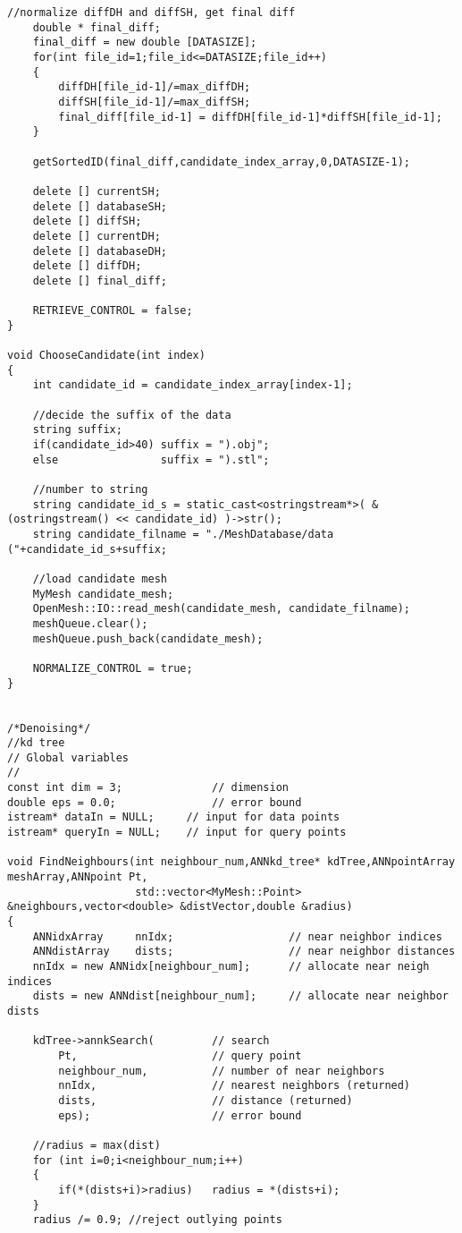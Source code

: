 \begin{enumerate}[1.]
\begin{lstlisting}[xleftmargin=0em]
	//normalize diffDH and diffSH, get final diff
	double * final_diff;
	final_diff = new double [DATASIZE];
	for(int file_id=1;file_id<=DATASIZE;file_id++)
	{
		diffDH[file_id-1]/=max_diffDH;
		diffSH[file_id-1]/=max_diffSH;
		final_diff[file_id-1] = diffDH[file_id-1]*diffSH[file_id-1]; 
	}

	getSortedID(final_diff,candidate_index_array,0,DATASIZE-1);
   
	delete [] currentSH;
	delete [] databaseSH;
	delete [] diffSH;
	delete [] currentDH;
	delete [] databaseDH;
	delete [] diffDH;
	delete [] final_diff;

	RETRIEVE_CONTROL = false;
}

void ChooseCandidate(int index)
{
	int candidate_id = candidate_index_array[index-1];

	//decide the suffix of the data
	string suffix;
	if(candidate_id>40)	suffix = ").obj";
	else				suffix = ").stl";

	//number to string
	string candidate_id_s = static_cast<ostringstream*>( &(ostringstream() << candidate_id) )->str();
	string candidate_filname = "./MeshDatabase/data ("+candidate_id_s+suffix;

	//load candidate mesh 
	MyMesh candidate_mesh;
	OpenMesh::IO::read_mesh(candidate_mesh, candidate_filname);
	meshQueue.clear();
	meshQueue.push_back(candidate_mesh);

	NORMALIZE_CONTROL = true;
}


/*Denoising*/
//kd tree
// Global variables
//
const int dim = 3;				// dimension
double eps = 0.0;				// error bound
istream* dataIn = NULL;		// input for data points
istream* queryIn = NULL;	// input for query points

void FindNeighbours(int neighbour_num,ANNkd_tree* kdTree,ANNpointArray meshArray,ANNpoint Pt,
					std::vector<MyMesh::Point> &neighbours,vector<double> &distVector,double &radius)
{
	ANNidxArray		nnIdx;					// near neighbor indices
	ANNdistArray	dists;					// near neighbor distances
	nnIdx = new ANNidx[neighbour_num];		// allocate near neigh indices
	dists = new ANNdist[neighbour_num];		// allocate near neighbor dists

	kdTree->annkSearch(			// search
		Pt,						// query point
		neighbour_num,	        // number of near neighbors
		nnIdx,					// nearest neighbors (returned)
		dists,					// distance (returned)
		eps);					// error bound
    
	//radius = max(dist)
	for (int i=0;i<neighbour_num;i++)
	{
		if(*(dists+i)>radius)	radius = *(dists+i); 
	}
	radius /= 0.9; //reject outlying points 


\end{lstlisting}
\end{enumerate}

